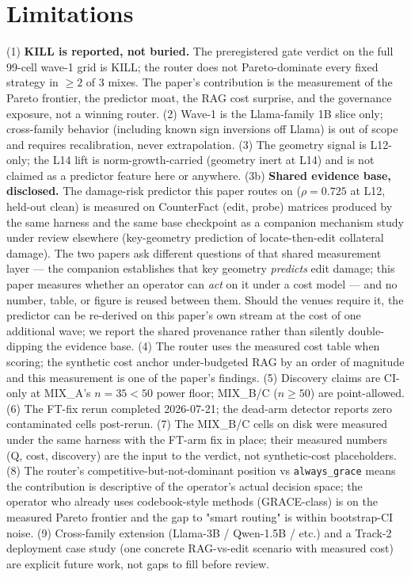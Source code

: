 \documentclass[preprint,12pt]{elsarticle}
\begin{document}
\section{Limitations}
\label{sec:limitations}
(1) \textbf{KILL is reported, not buried.} The preregistered gate verdict on the
full 99-cell wave-1 grid is KILL; the router does not Pareto-dominate every fixed
strategy in $\ge 2$ of 3 mixes. The paper's contribution is the measurement of the
Pareto frontier, the predictor moat, the RAG cost surprise, and the governance
exposure, not a winning router. (2) Wave-1 is the Llama-family 1B slice only;
cross-family behavior (including known sign inversions off Llama) is out of scope
and requires recalibration, never extrapolation. (3) The geometry signal is L12-only;
the L14 lift is norm-growth-carried (geometry inert at L14) and is not claimed
as a predictor feature here or anywhere. (3b) \textbf{Shared evidence base,
disclosed.} The damage-risk predictor this paper routes on ($\rho = 0.725$ at
L12, held-out clean) is measured on CounterFact (edit, probe) matrices
produced by the same harness and the same base checkpoint as a companion
mechanism study under review elsewhere (key-geometry prediction of
locate-then-edit collateral damage). The two papers ask different questions of
that shared measurement layer --- the companion establishes that key geometry
\emph{predicts} edit damage; this paper measures whether an operator can
\emph{act} on it under a cost model --- and no number, table, or figure is
reused between them. Should the venues require it, the predictor can be
re-derived on this paper's own stream at the cost of one additional wave; we
report the shared provenance rather than silently double-dipping the evidence
base. (4) The router uses the measured cost
table when scoring; the synthetic cost anchor under-budgeted RAG by an order of
magnitude and this measurement is one of the paper's findings. (5) Discovery
claims are CI-only at MIX\_A's $n = 35 < 50$ power floor; MIX\_B/C ($n \ge 50$)
are point-allowed. (6) The FT-fix rerun completed 2026-07-21; the dead-arm
detector reports zero contaminated cells post-rerun. (7) The MIX\_B/C cells on
disk were measured under the same harness with the FT-arm fix in place; their
measured numbers (Q, cost, discovery) are the input to the verdict, not
synthetic-cost placeholders. (8) The router's competitive-but-not-dominant
position vs \texttt{always\_grace} means the contribution is descriptive of the
operator's actual decision space; the operator who already uses codebook-style
methods (GRACE-class) is on the measured Pareto frontier and the gap to "smart
routing" is within bootstrap-CI noise. (9) Cross-family extension (Llama-3B /
Qwen-1.5B / etc.) and a Track-2 deployment case study (one concrete RAG-vs-edit
scenario with measured cost) are explicit future work, not gaps to fill before
review.
\end{document}
